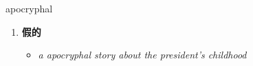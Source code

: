 
\begin{frame}
{\huge apocryphal}
\begin{center}
\begin{enumerate}\Large
  \item \textbf{假的}
  \begin{itemize}
    \item \em{\Large{a apocryphal story about the president's childhood}}
  \end{itemize}
\end{enumerate}
\end{center}
\end{frame}
